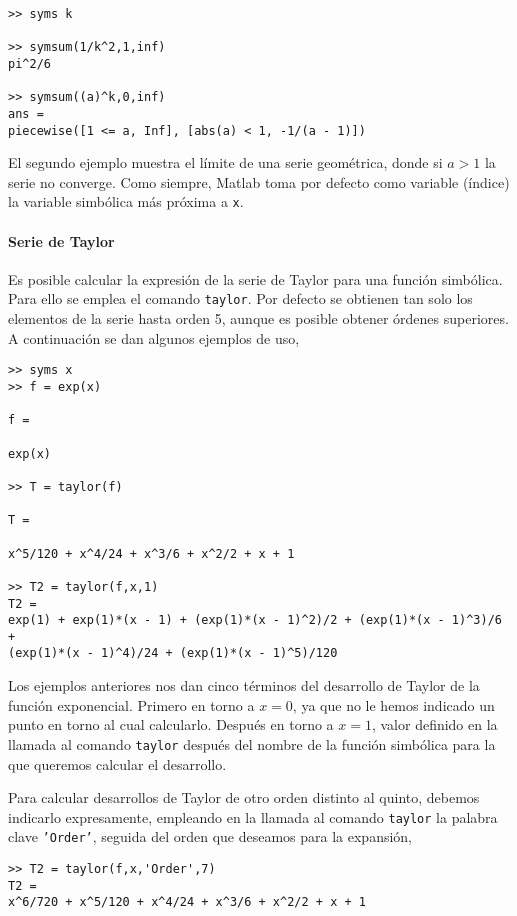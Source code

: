 \begin{verbatim}
>> syms k

>> symsum(1/k^2,1,inf)
pi^2/6

>> symsum((a)^k,0,inf)
ans =
piecewise([1 <= a, Inf], [abs(a) < 1, -1/(a - 1)])
\end{verbatim}
El segundo ejemplo muestra el límite de una serie geométrica, donde si $a>1$ la serie no converge. Como siempre, Matlab toma por defecto como variable (índice) la variable simbólica más próxima a \texttt{x}.

\paragraph{Serie de Taylor} Es posible calcular la expresión de la serie de Taylor para una función simbólica. Para ello se emplea el comando \texttt{taylor}. Por defecto se obtienen tan solo los elementos de la serie hasta orden 5, aunque es posible obtener órdenes superiores. A continuación se dan algunos ejemplos de uso,
\begin{verbatim}
>> syms x
>> f = exp(x)
 
f =
 
exp(x)
 
>> T = taylor(f)
 
T =
 
x^5/120 + x^4/24 + x^3/6 + x^2/2 + x + 1
 
>> T2 = taylor(f,x,1)
T2 =
exp(1) + exp(1)*(x - 1) + (exp(1)*(x - 1)^2)/2 + (exp(1)*(x - 1)^3)/6 +
(exp(1)*(x - 1)^4)/24 + (exp(1)*(x - 1)^5)/120
\end{verbatim}

Los ejemplos anteriores nos dan cinco términos del desarrollo de Taylor de la función exponencial. Primero en torno a $x = 0$, ya que no le hemos indicado un punto en torno al cual calcularlo. Después en torno a $x = 1$, valor definido en la llamada al comando \texttt{taylor} después del nombre de la función simbólica para la que queremos calcular el desarrollo.

Para calcular desarrollos de Taylor de otro orden distinto al quinto, debemos indicarlo expresamente, empleando en la llamada al comando \texttt{taylor} la palabra clave \texttt{'Order'}, seguida del orden que deseamos para la expansión,

\begin{verbatim}
>> T2 = taylor(f,x,'Order',7) 
T2 = 
x^6/720 + x^5/120 + x^4/24 + x^3/6 + x^2/2 + x + 1
\end{verbatim} 

